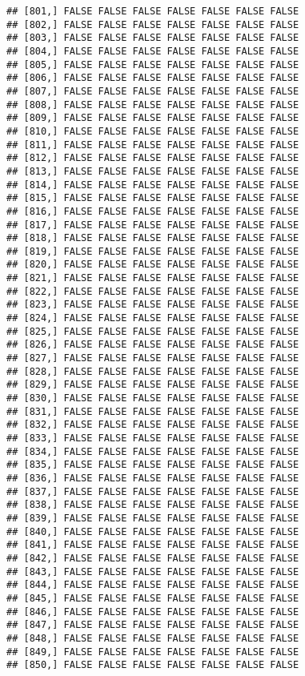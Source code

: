 \documentclass[
]{article}
\begin{document}
\begin{verbatim}
## [801,] FALSE FALSE FALSE FALSE FALSE FALSE FALSE
## [802,] FALSE FALSE FALSE FALSE FALSE FALSE FALSE
## [803,] FALSE FALSE FALSE FALSE FALSE FALSE FALSE
## [804,] FALSE FALSE FALSE FALSE FALSE FALSE FALSE
## [805,] FALSE FALSE FALSE FALSE FALSE FALSE FALSE
## [806,] FALSE FALSE FALSE FALSE FALSE FALSE FALSE
## [807,] FALSE FALSE FALSE FALSE FALSE FALSE FALSE
## [808,] FALSE FALSE FALSE FALSE FALSE FALSE FALSE
## [809,] FALSE FALSE FALSE FALSE FALSE FALSE FALSE
## [810,] FALSE FALSE FALSE FALSE FALSE FALSE FALSE
## [811,] FALSE FALSE FALSE FALSE FALSE FALSE FALSE
## [812,] FALSE FALSE FALSE FALSE FALSE FALSE FALSE
## [813,] FALSE FALSE FALSE FALSE FALSE FALSE FALSE
## [814,] FALSE FALSE FALSE FALSE FALSE FALSE FALSE
## [815,] FALSE FALSE FALSE FALSE FALSE FALSE FALSE
## [816,] FALSE FALSE FALSE FALSE FALSE FALSE FALSE
## [817,] FALSE FALSE FALSE FALSE FALSE FALSE FALSE
## [818,] FALSE FALSE FALSE FALSE FALSE FALSE FALSE
## [819,] FALSE FALSE FALSE FALSE FALSE FALSE FALSE
## [820,] FALSE FALSE FALSE FALSE FALSE FALSE FALSE
## [821,] FALSE FALSE FALSE FALSE FALSE FALSE FALSE
## [822,] FALSE FALSE FALSE FALSE FALSE FALSE FALSE
## [823,] FALSE FALSE FALSE FALSE FALSE FALSE FALSE
## [824,] FALSE FALSE FALSE FALSE FALSE FALSE FALSE
## [825,] FALSE FALSE FALSE FALSE FALSE FALSE FALSE
## [826,] FALSE FALSE FALSE FALSE FALSE FALSE FALSE
## [827,] FALSE FALSE FALSE FALSE FALSE FALSE FALSE
## [828,] FALSE FALSE FALSE FALSE FALSE FALSE FALSE
## [829,] FALSE FALSE FALSE FALSE FALSE FALSE FALSE
## [830,] FALSE FALSE FALSE FALSE FALSE FALSE FALSE
## [831,] FALSE FALSE FALSE FALSE FALSE FALSE FALSE
## [832,] FALSE FALSE FALSE FALSE FALSE FALSE FALSE
## [833,] FALSE FALSE FALSE FALSE FALSE FALSE FALSE
## [834,] FALSE FALSE FALSE FALSE FALSE FALSE FALSE
## [835,] FALSE FALSE FALSE FALSE FALSE FALSE FALSE
## [836,] FALSE FALSE FALSE FALSE FALSE FALSE FALSE
## [837,] FALSE FALSE FALSE FALSE FALSE FALSE FALSE
## [838,] FALSE FALSE FALSE FALSE FALSE FALSE FALSE
## [839,] FALSE FALSE FALSE FALSE FALSE FALSE FALSE
## [840,] FALSE FALSE FALSE FALSE FALSE FALSE FALSE
## [841,] FALSE FALSE FALSE FALSE FALSE FALSE FALSE
## [842,] FALSE FALSE FALSE FALSE FALSE FALSE FALSE
## [843,] FALSE FALSE FALSE FALSE FALSE FALSE FALSE
## [844,] FALSE FALSE FALSE FALSE FALSE FALSE FALSE
## [845,] FALSE FALSE FALSE FALSE FALSE FALSE FALSE
## [846,] FALSE FALSE FALSE FALSE FALSE FALSE FALSE
## [847,] FALSE FALSE FALSE FALSE FALSE FALSE FALSE
## [848,] FALSE FALSE FALSE FALSE FALSE FALSE FALSE
## [849,] FALSE FALSE FALSE FALSE FALSE FALSE FALSE
## [850,] FALSE FALSE FALSE FALSE FALSE FALSE FALSE

\end{verbatim}
\end{document}
